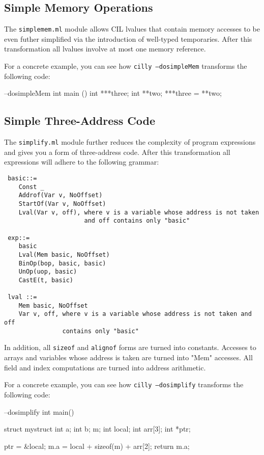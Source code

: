 \documentclass{article}
\def\t#1{{\tt #1}}
\begin{document}
\subsection{Simple Memory Operations} 

The \t{simplemem.ml} module allows CIL lvalues that contain memory accesses
to be even futher simplified via the introduction of well-typed
temporaries. After this transformation all lvalues involve at
most one memory reference. 

For a concrete example, you can see how \t{cilly --dosimpleMem} 
transforms the following code:

\begin{cilcode}[global] --dosimpleMem
  int main () {
    int ***three;
    int **two;
    ***three = **two; 
  } 
\end{cilcode}

\subsection{Simple Three-Address Code} 

The \t{simplify.ml} module further reduces the complexity of program
expressions and gives you a form of three-address code. After this
transformation all expressions will adhere to the following grammar: 
\begin{verbatim}
 basic::=
    Const _ 
    Addrof(Var v, NoOffset)
    StartOf(Var v, NoOffset)
    Lval(Var v, off), where v is a variable whose address is not taken
                      and off contains only "basic"

 exp::=
    basic
    Lval(Mem basic, NoOffset)
    BinOp(bop, basic, basic)
    UnOp(uop, basic)
    CastE(t, basic)
   
 lval ::= 
    Mem basic, NoOffset
    Var v, off, where v is a variable whose address is not taken and off
                contains only "basic"
\end{verbatim}
In addition, all \t{sizeof} and \t{alignof} forms are turned into
constants. Accesses to arrays and variables whose address is taken are
turned into "Mem" accesses. All field and index computations are turned
into address arithmetic.

For a concrete example, you can see how \t{cilly --dosimplify} 
transforms the following code:

\begin{cilcode}[global] --dosimplify
  int main() {
    struct mystruct {
      int a;
      int b;
    } m;
    int local;
    int arr[3];
    int *ptr;

    ptr = &local;
    m.a = local + sizeof(m) + arr[2];
    return m.a; 
  } 
\end{cilcode}
\end{document}
